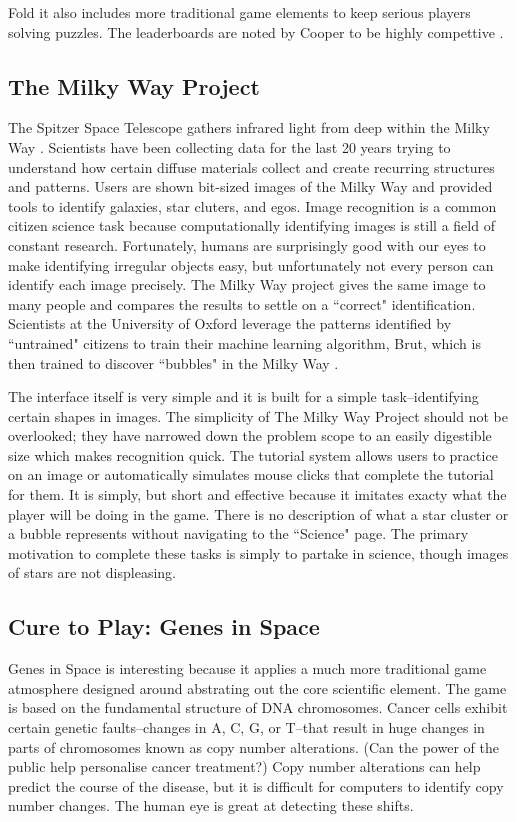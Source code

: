 Fold it also includes more traditional game elements to keep serious players solving puzzles. The leaderboards are noted by Cooper to be highly compettive \cite{cooper2010challenge}.

\subsection{The Milky Way Project}

The Spitzer Space Telescope gathers infrared light from deep within the Milky Way \cite{milkyway2014}. Scientists have been collecting data for the last 20 years trying to understand how certain diffuse materials collect and create recurring structures and patterns. Users are shown bit-sized images of the Milky Way and provided tools to identify galaxies, star cluters, and egos. Image recognition is a common citizen science task because computationally identifying images is still a field of constant research. Fortunately, humans are surprisingly good with our eyes to make identifying irregular objects easy, but unfortunately not every person can identify each image precisely. The Milky Way project gives the same image to many people and compares the results to settle on a ``correct" identification. Scientists at the University of Oxford leverage the patterns identified by ``untrained" citizens to train their machine learning algorithm, Brut, which is then trained to discover ``bubbles" in the Milky Way \cite{milkyway2014}.

The interface itself is very simple and it is built for a simple task--identifying certain shapes in images. The simplicity of The Milky Way Project should not be overlooked; they have narrowed down the problem scope to an easily digestible size which makes recognition quick. The tutorial system allows users to practice on an image or automatically simulates mouse clicks that complete the tutorial for them. It is simply, but short and effective because it imitates exacty what the player will be doing in the game. There is no description of what a star cluster or a bubble represents without navigating to the ``Science" page. The primary motivation to complete these tasks is simply to partake in science, though images of stars are not displeasing.

\subsection{Cure to Play: Genes in Space}

Genes in Space is interesting because it applies a much more traditional game atmosphere designed around abstrating out the core scientific element. The game is based on the fundamental structure of DNA chromosomes. Cancer cells exhibit certain genetic faults--changes in A, C, G, or T--that result in huge changes in parts of chromosomes known as copy number alterations. (Can the power of the public help personalise cancer treatment?) Copy number alterations can help predict the course of the disease, but it is difficult for computers to identify copy number changes. The human eye is great at detecting these shifts.


